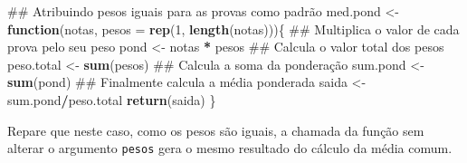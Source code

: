 \documentclass[10pt,a4paper]{book}
\newenvironment{Shaded}{\begin{snugshade}}{\end{snugshade}}
\newcommand{\KeywordTok}[1]{\textcolor[rgb]{0.13,0.29,0.53}{\textbf{#1}}}
\newcommand{\DataTypeTok}[1]{\textcolor[rgb]{0.13,0.29,0.53}{#1}}
\newcommand{\DecValTok}[1]{\textcolor[rgb]{0.00,0.00,0.81}{#1}}
\newcommand{\StringTok}[1]{\textcolor[rgb]{0.31,0.60,0.02}{#1}}
\newcommand{\ControlFlowTok}[1]{\textcolor[rgb]{0.13,0.29,0.53}{\textbf{#1}}}
\newcommand{\OperatorTok}[1]{\textcolor[rgb]{0.81,0.36,0.00}{\textbf{#1}}}
\newcommand{\NormalTok}[1]{#1}
\begin{document}
\begin{Shaded}
\begin{Highlighting}[]
\NormalTok{## Atribuindo pesos iguais para as provas como padrão}
\NormalTok{med.pond <-}\StringTok{ }\ControlFlowTok{function}\NormalTok{(notas, }\DataTypeTok{pesos =} \KeywordTok{rep}\NormalTok{(}\DecValTok{1}\NormalTok{, }\KeywordTok{length}\NormalTok{(notas)))\{}
\NormalTok{    ## Multiplica o valor de cada prova pelo seu peso}
\NormalTok{    pond <-}\StringTok{ }\NormalTok{notas }\OperatorTok{*}\StringTok{ }\NormalTok{pesos}
\NormalTok{    ## Calcula o valor total dos pesos}
\NormalTok{    peso.total <-}\StringTok{ }\KeywordTok{sum}\NormalTok{(pesos)}
\NormalTok{    ## Calcula a soma da ponderação}
\NormalTok{    sum.pond <-}\StringTok{ }\KeywordTok{sum}\NormalTok{(pond)}
\NormalTok{    ## Finalmente calcula a média ponderada}
\NormalTok{    saida <-}\StringTok{ }\NormalTok{sum.pond}\OperatorTok{/}\NormalTok{peso.total}
    \KeywordTok{return}\NormalTok{(saida)}
\NormalTok{\}}
\end{Highlighting}
\end{Shaded}

Repare que neste caso, como os pesos são iguais, a chamada da função sem
alterar o argumento \texttt{pesos} gera o mesmo resultado do cálculo da
média comum.
\end{document}
